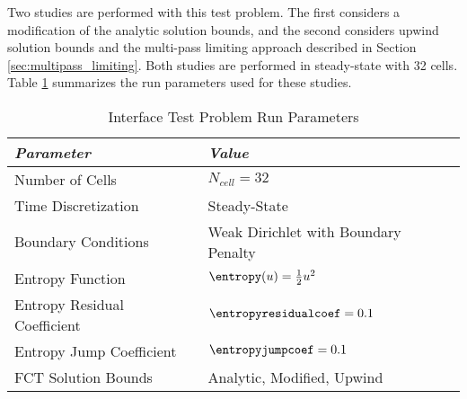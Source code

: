 Two studies are performed with this test
problem. The first considers a modification of the analytic solution bounds,
and the second considers upwind solution bounds and the multi-pass limiting
approach described in Section \ref{sec:multipass_limiting}.
Both studies are performed in steady-state with 32 cells.
Table \ref{tab:interface_run_parameters} summarizes the run parameters used
for these studies.

\begin{table}[ht]\caption{Interface Test Problem Run Parameters}
\label{tab:interface_run_parameters}
\centering
\begin{tabular}{l l}\toprule
\emph{Parameter} & \emph{Value}\\\midrule
Number of Cells & $N_{cell} = 32$\\
Time Discretization & Steady-State\\
Boundary Conditions & Weak Dirichlet with Boundary Penalty\\\midrule
Entropy Function & $\entropy(u) = \frac{1}{2}u^2$\\
Entropy Residual Coefficient & $\entropyresidualcoef = 0.1$\\
Entropy Jump Coefficient & $\entropyjumpcoef = 0.1$\\\midrule
FCT Solution Bounds & Analytic, Modified, Upwind\\
\bottomrule\end{tabular}
\end{table}

